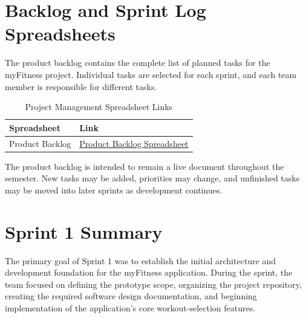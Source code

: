 \documentclass[11pt]{article}
\begin{document}

\section{Backlog and Sprint Log Spreadsheets}

The product backlog contains the complete list of planned tasks for the myFitness project. Individual tasks are selected for each sprint, and each team member is responsible for different tasks.

\begin{table}[H]
    \centering
    \caption{Project Management Spreadsheet Links}

    \begin{tabular}{p{5cm} p{8cm}}
        \toprule
        \textbf{Spreadsheet} & \textbf{Link} \\
        \midrule

        Product Backlog &
        \href{https://docs.google.com/spreadsheets/d/1xrKYs-RFVQu-aNUGRoevxVg7lkJFbCBTARkh_YYx9SU/edit?usp=sharing}
        {Product Backlog Spreadsheet} \\

        \bottomrule
    \end{tabular}
\end{table}

The product backlog is intended to remain a live document throughout
the semester. New tasks may be added, priorities may change, and
unfinished tasks may be moved into later sprints as development
continues.

\newpage


\section{Sprint 1 Summary}

The primary goal of Sprint 1 was to establish the initial architecture and development foundation for the myFitness application. During the sprint, the team focused on defining the prototype scope, organizing the project repository, creating the required software design documentation, and beginning implementation of the application's core workout-selection features.
\end{document}
